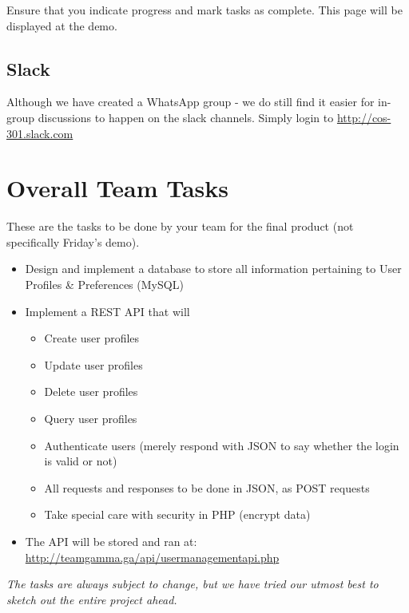 \documentclass{article}
\begin{document}
Ensure that you indicate progress and mark tasks as complete. This page will be displayed at the demo.

\subsection{Slack}
Although we have created a WhatsApp group - we do still find it easier for in-group discussions to happen on the slack channels. Simply login to \url{http://cos-301.slack.com}

\newpage

\section{Overall Team Tasks}
These are the tasks to be done by your team for the final product (not specifically Friday's demo).

\begin{itemize}
    \item Design and implement a database to store all information pertaining to User Profiles \& Preferences (MySQL)
    \item Implement a REST API that will
    \begin{itemize}
        \item Create user profiles
        \item Update user profiles
        \item Delete user profiles
        \item Query user profiles
        \item Authenticate users (merely respond with JSON to say whether the login is valid or not)
        \item All requests and responses to be done in JSON, as POST requests
        \item Take special care with security in PHP (encrypt data)
    \end{itemize}
    \item The API will be stored and ran at: \url{http://teamgamma.ga/api/usermanagementapi.php}
\end{itemize}

\vspace{1cm}

\begin{center}
   \textit{The tasks are always subject to change, but we have tried our utmost best to sketch out the entire project ahead.}
\end{center}
\end{document}
